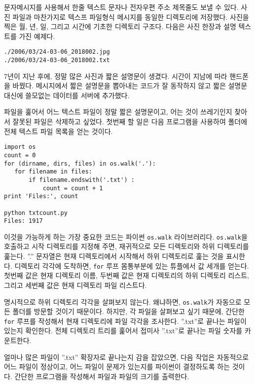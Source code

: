 문자메시지를 사용해서 한줄 텍스트 문자나 전자우편 주소 제목줄도 보낼 수 있다. 
사진 파일과 마찬가지로 텍스프 파일형식 메시지를 동일한 디렉토리에 저장했다.
사진을 찍은 월, 년, 일, 그리고 시간에 기초한 디렉토리 구조다.
다음은 사진 한장과 설명 텍스트를 가진 예제다.

\beforeverb
\begin{verbatim}
./2006/03/24-03-06_2018002.jpg
./2006/03/24-03-06_2018002.txt
\end{verbatim}
\afterverb
%

7년이 지난 후에, 정말 많은 사진과 짧은 설명문이 생겼다. 
시간이 지남에 따라 핸드폰을 바꿨다.
메시지에서 짧은 설명문을 뽑아내는 코드가 잘 동작하지 않고 짧은 설명문 대신에 쓸모없는 데이터를 서버에 추가했다.

파일을 훑어서 어느 텍스트 파일이 정말 짧은 설명문이고, 어는 것이 쓰레기인지 찾아서 잘못된 파일은 삭제하고 싶었다. 
첫번째 할 일은 다음 프로그램을 사용하여 폴더에 전체 텍스트 파일 목록을 얻는 것이다.

\beforeverb
\begin{verbatim}
import os
count = 0
for (dirname, dirs, files) in os.walk('.'):
   for filename in files:
       if filename.endswith('.txt') :
           count = count + 1
print 'Files:', count

python txtcount.py
Files: 1917
\end{verbatim}
\afterverb
%

이것을 가능하게 하는 가장 중요한 코드는 파이썬 {\tt os.walk} 라이브러리다.
{\tt os.walk}을 호출하고 시작 디렉토리를 지정해 주면, 재귀적으로 모든 디렉토리와 하위 디렉토리를 훑는다.
''.'' 문자열은 현재 디렉토리에서 시작해서 하위 디렉토리로 훑는 것을 표시한다.
디렉토리 각각에 도착하면, {\tt for} 루프 몸통부분에 있는 튜플에서 값 세개를 얻는다.
첫번째 값은 현재 디렉토리 이름, 두번째 값은 현재 디렉토리의 하위 디렉토리 리스트, 그리고 세번째 값은
현재 디렉토리 파일 리스트다.

명시적으로 하위 디렉토리 각각을 살펴보지 않는다. 
왜냐하면, {\tt os.walk}가 자동으로 모든 폴더를 방문할 것이기 때문이다.
하지만, 각 파일을 살펴보고 싶기 때문에, 간단한 {\tt for} 루프를 작성해서 현재 디렉토리에 
파일 각각을 조사한다. 
''.txt''로 끝나는 파일이 있는지 확인한다.
전체 디렉토리 트리를 훑어서 접미사 ''.txt''로 끝나는 파일 숫자를 카운트한다.

얼마나 많은 파일이 ''.txt'' 확장자로 끝나는지 감을 잡았으면, 다음 작업은 자동적으로
어느 파일이 정상이고, 어느 파일이 문제가 있는지를 파이썬이 결정하도록 하는 것이다.
간단한 프로그램을 작성해서 파일과 파일의 크기를 출력한다.

